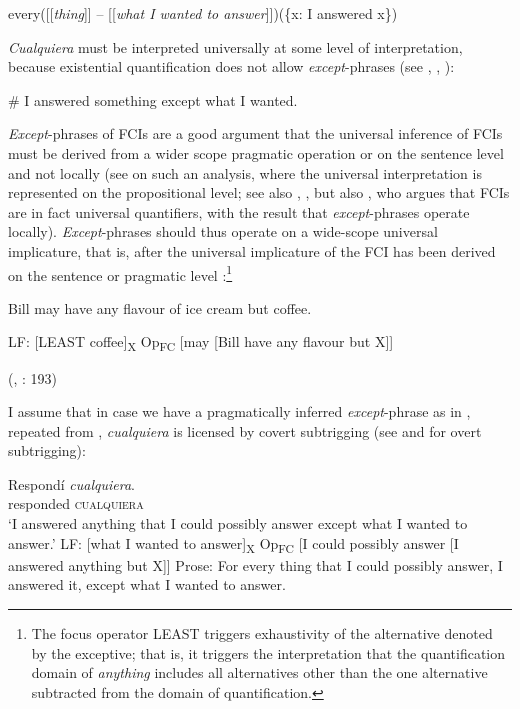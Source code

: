 every([[\textit{thing}]] – [[\textit{what I wanted to answer}]])(\{x: I answered x\})
\z

\textit{Cualquiera} must be interpreted universally at some level of interpretation, because existential quantification does not allow \textit{except}{}-phrases (see \citealt{Fintel1994}, \citealt{Arregui2006}, \citealt{Gajewski2008}):

\ea \label{ex:key:239} %
  \#  I answered something except what I wanted.
\z

\textit{Except}{}-phrases of FCIs are a good argument that the universal inference of FCIs must be derived from a wider scope pragmatic operation or on the sentence level and not locally (see  on such an analysis, where the universal interpretation is represented on the propositional level; see also \citealt{Chierchia2006}, \citealt{Gajewski2008}, but also \citealt{Dayal1998,Dayal2004}, who argues that FCIs are in fact universal quantifiers, with the result that \textit{except}{}-phrases operate locally). \textit{Except}{}-phrases should thus operate on a wide-scope universal implicature, that is, after the universal implicature of the FCI has been derived on the sentence or pragmatic level \citep{Gajewski2008}:\footnote{{The focus operator LEAST triggers exhaustivity of the alternative denoted by the exceptive; that is, it triggers the interpretation that the quantification domain of \textit{anything} includes all alternatives other than the one alternative subtracted from the domain of quantification.}}

\ea \label{ex:key:240} %
    Bill may have any flavour of ice cream but coffee.

    LF: [LEAST coffee]\textsubscript{X} Op\textsubscript{FC} [may [Bill have any flavour but X]]

    (\citealt{Gajewski2008}, \citealt{Gajewski2013}: 193)
\z

I assume that in case we have a pragmatically inferred \textit{except}{}-phrase as in , repeated from , \textit{cualquiera} is licensed by covert subtrigging (see \citealt{Quer2000} and  for overt subtrigging):

\ea \label{bkm:Ref63461661} %
\ea \gll Respondí \textit{cualquiera}.\\
responded \textsc{cualquiera}\\
\glt ‘I answered anything that I could possibly answer except what I wanted to answer.’
\ex LF: [what I wanted to answer]\textsubscript{X} Op\textsubscript{FC} [I could possibly answer [I answered anything but X]]
\ex Prose: For every thing that I could possibly answer, I answered it, except what I wanted to answer.
\z
\z


